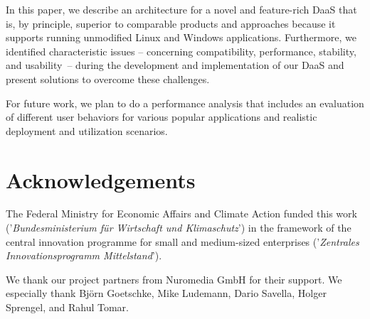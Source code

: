 \documentclass[runningheads]{llncs}
\begin{document}
In this paper, we describe an architecture for a novel and feature-rich DaaS that is, by principle, superior to comparable products and approaches because it supports running unmodified Linux and Windows applications. Furthermore, we identified characteristic issues -- concerning compatibility, performance, stability, and usability -- during the development and implementation of our DaaS and present solutions to overcome these challenges.


For future work, we plan to do a performance analysis that includes an evaluation of different user behaviors for various popular applications and realistic deployment and utilization scenarios.


\section*{Acknowledgements}

The Federal Ministry for Economic Affairs and Climate Action funded this work
('\textsl{Bundesministerium f\"ur Wirtschaft und Klimaschutz}')
in the framework of the central innovation programme
for small and medium-sized enterprises
('\textsl{Zentrales Innovationsprogramm Mittelstand}').

We thank our project partners from Nuromedia GmbH for their support.
We especially thank Björn Goetschke, Mike Ludemann, Dario Savella, Holger Sprengel, and Rahul Tomar.



%
%


%

\end{document}
